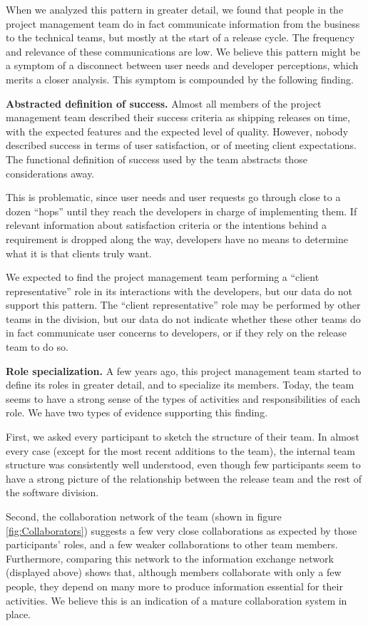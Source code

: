 When we analyzed this pattern in greater detail, we found that people in the project management team do in fact communicate information from the business to the technical teams, but mostly at the start of a release cycle. The frequency and relevance of these communications are low. We believe this pattern might be a symptom of a disconnect between user needs and developer perceptions, which merits a closer analysis. This symptom is compounded by the following finding.

\textbf{Abstracted definition of success.} Almost all members of the project management team described their success criteria as shipping releases on time, with the expected features and the expected level of quality. However, nobody described success in terms of user satisfaction, or of meeting client expectations. The functional definition of success used by the team abstracts those considerations away.

This is problematic, since user needs and user requests go through close to a dozen ``hops'' until they reach the developers in charge of implementing them. If relevant information about satisfaction criteria or the intentions behind a requirement is dropped along the way, developers have no means to determine what it is that clients truly want.

We expected to find the project management team performing a ``client representative'' role in its interactions with the developers, but our data do not support this pattern. The ``client representative'' role may be performed by other teams in the division, but our data do not indicate whether these other teams do in fact communicate user concerns to developers, or if they rely on the release team to do so.

\textbf{Role specialization.} A few years ago, this project management team started to define its roles in greater detail, and to specialize its members. Today, the team seems to have a strong sense of the types of activities and responsibilities of each role. We have two types of evidence supporting this finding.

First, we asked every participant to sketch the structure of their team. In almost every case (except for the most recent additions to the team), the internal team structure was consistently well understood, even though few participants seem to have a strong picture of the relationship between the release team and the rest of the software division.

Second, the collaboration network of the team (shown in figure \ref{fig:Collaborators}) suggests a few very close collaborations as expected by those participants' roles, and a few weaker collaborations to other team members. Furthermore, comparing this network to the information exchange network (displayed above) shows that, although members collaborate with only a few people, they depend on many more to produce information essential for their activities. We believe this is an indication of a mature collaboration system in place.

